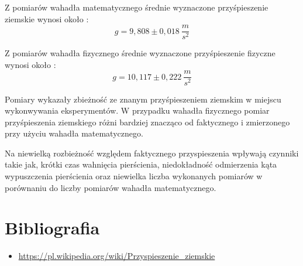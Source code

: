 \documentclass[12pt]{article}
\begin{document}
Z pomiarów wahadła matematycznego średnie wyznaczone przyśpieszenie ziemskie wynosi około :
$$ g = 9,808 \pm 0,018 \ \frac{m}{s^2} $$

Z pomiarów wahadła fizycznego średnie wyznaczone przyśpieszenie fizyczne wynosi około :
$$ g = 10,117 \pm 0,222 \ \frac{m}{s^2} $$

Pomiary wykazały zbieżność ze znanym przyśpieszeniem ziemskim w miejscu wykonwywania eksperymentów. W przypadku wahadła 
fizycznego pomiar przyśpieszenia ziemskiego różni bardziej znacząco od faktycznego i zmierzonego przy użyciu wahadła matematycznego.

Na niewielką rozbieżność względem faktycznego przyspieszenia wpływają czynniki takie jak, krótki czas wahnięcia pierścienia,
niedokładność odmierzenia kąta wypuszczenia pierścienia oraz niewielka liczba wykonanych pomiarów w porównaniu do liczby pomiarów wahadła matematycznego. \\

\section{Bibliografia}
\begin{itemize}
    \item \url{https://pl.wikipedia.org/wiki/Przyspieszenie_ziemskie}
\end{itemize}
\end{document}
